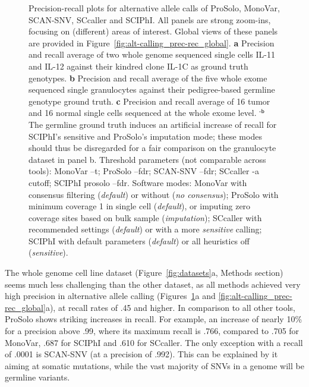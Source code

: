 \documentclass[12pt,inline]{wlscirep}
\begin{document}
\begin{figure}[!tpb]
 \caption{
  Precision-recall plots for alternative allele calls of ProSolo, MonoVar, SCAN-SNV, SCcaller and SCIPhI.
  All panels are strong zoom-ins, focusing on (different) areas of interest.
  Global views of these panels are provided in Figure~\ref{fig:alt-calling_prec-rec_global}.
  \textbf{a} Precision and recall average of two whole genome sequenced single cells IL-11 and IL-12 against their kindred clone IL-1C as ground truth genotypes.
  \textbf{b} Precision and recall average of the five whole exome sequenced single granulocytes against their pedigree-based germline genotype ground truth.
  \textbf{c} Precision and recall average of 16 tumor and 16 normal single cells sequenced at the whole exome level. \newline
  $^\text{\sffamily-b}$ The germline ground truth induces an artificial increase of recall for SCIPhI's sensitive and ProSolo's imputation mode; these modes should thus be disregarded for a fair comparison on the granulocyte dataset in panel b. \newline \footnotesize
  Threshold parameters (not comparable across tools):
  MonoVar {\ttfamily --t};
  ProSolo {\ttfamily --fdr};
  SCAN-SNV {\ttfamily --fdr};
  SCcaller {\ttfamily -a cutoff};
  SCIPhI {\ttfamily prosolo --fdr}.
  Software modes:
  MonoVar with consensus filtering ({\itshape default}) or without ({\itshape no consensus});
  ProSolo with minimum coverage 1 in single cell ({\itshape default}), or imputing zero coverage sites based on bulk sample ({\itshape imputation});
  SCcaller with recommended settings ({\itshape default}) or with a more {\itshape sensitive} calling;
  SCIPhI with default parameters ({\itshape default}) or all heuristics off ({\itshape sensitive}).
 }
\label{fig:alt-calling_prec-rec}
\end{figure}

The whole genome cell line dataset (Figure~\ref{fig:datasets}a, Methods section) seems much less challenging than the other dataset, as all methods achieved very high precision in alternative allele calling (Figures~\ref{fig:alt-calling_prec-rec}a and \ref{fig:alt-calling_prec-rec_global}a), at recall rates of .45 and higher. 
In comparison to all other tools, ProSolo shows striking increases in recall.
For example, an increase of nearly 10\% for a precision above .99, where its maximum recall is .766, compared to .705 for MonoVar, .687 for SCIPhI and .610 for SCcaller.
The only exception with a recall of .0001 is SCAN-SNV (at a precision of .992).
This can be explained by it aiming at somatic mutations, while the vast majority of SNVs in a genome will be germline variants.
\end{document}
